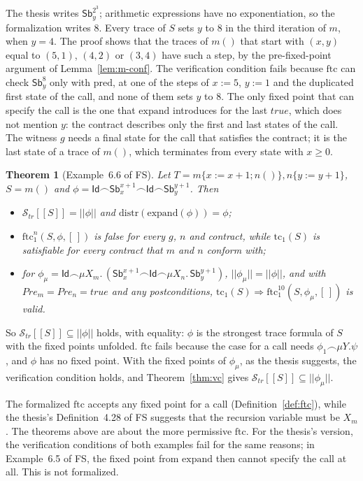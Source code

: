 \documentclass[11pt]{article}
\newcommand{\sem}[1]{[\![ #1 ]\!]}
\newcommand{\fsem}[1]{|\!|#1|\!|}
\newcommand{\Str}{{\mathcal{S}_{\mathit{tr}}}}
\newcommand{\chop}{\smallfrown}
\newcommand{\Id}{\mathsf{Id}}
\newcommand{\Sb}[2]{\mathsf{Sb}^{#1}_{#2}}
\newcommand{\call}[1]{#1()}
\newcommand{\Pre}{\mathit{Pre}}
\newcommand{\tc}{\mathrm{tc}}
\newcommand{\ftc}{\mathrm{ftc}}
\newcommand{\pred}{\mathrm{pred}}
\newcommand{\distr}{\mathrm{distr}}
\newcommand{\Th}[1]{#1 of FS}
\theoremstyle{plain}
\newtheorem{theorem}{Theorem}[section]
\theoremstyle{definition}
\theoremstyle{remark}
\begin{document}
The thesis writes $\Sb{2^3}{y}$; arithmetic expressions have no
exponentiation, so the formalization writes $8$. Every trace of $S$ sets
$y$ to $8$ in the third iteration of $m$, when $y = 4$. The proof shows
that the traces of $\call{m}$ that start with $(x, y)$ equal to $(5, 1)$,
$(4, 2)$ or $(3, 4)$ have such a step, by the pre-fixed-point argument of
Lemma~\ref{lem:m-conf}. The verification condition fails because $\ftc$
can check $\Sb{8}{y}$ only with $\pred$, at one of the steps of $x := 5$,
$y := 1$ and the duplicated first state of the call, and none of them
sets $y$ to $8$. The only fixed point that can specify the call is the
one that $\mathrm{expand}$ introduces for the last $\mathit{true}$, which
does not mention $y$: the contract describes only the first and last
states of the call. The witness $g$ needs a final state for the call that
satisfies the contract; it is the last state of a trace of $\call{m}$,
which terminates from every state with $x \ge 0$.

\begin{theorem}[\Th{Example~6.6}]\label{thm:ex66}
  Let $T = m\{x := x + 1; \call{n}\}, n\{y := y + 1\}$, $S = \call{m}$ and
  $\phi = \Id\chop\Sb{x+1}{x}\chop\Id\chop\Sb{y+1}{y}$. Then
  \begin{itemize}
  \item $\Str\sem{S} = \fsem{\phi}$ and $\distr(\mathrm{expand}(\phi)) =
    \phi$;
  \item $\ftc^n_1(S, \phi, [\,])$ is false for every $g$, $n$ and
    contract, while $\tc_1(S)$ is satisfiable for every contract that $m$
    and $n$ conform with;
  \item for $\phi_\mu = \Id\chop\mu X_m.\,(\Sb{x+1}{x}\chop\Id\chop\mu
    X_n.\,\Sb{y+1}{y})$, $\fsem{\phi_\mu} = \fsem{\phi}$, and with
    $\Pre_m = \Pre_n = \mathit{true}$ and any postconditions, $\tc_1(S)
    \Rightarrow \ftc^{10}_1(S, \phi_\mu, [\,])$ is valid.
  \end{itemize}
\end{theorem}

So $\Str\sem{S} \subseteq \fsem{\phi}$ holds, with equality: $\phi$ is the
strongest trace formula of $S$ with the fixed points unfolded. $\ftc$
fails because the case for a call needs $\phi_1\chop\mu Y.\psi$, and
$\phi$ has no fixed point. With the fixed points of $\phi_\mu$, as the
thesis suggests, the verification condition holds, and
Theorem~\ref{thm:vc} gives $\Str\sem{S} \subseteq \fsem{\phi_\mu}$.

The formalized $\ftc$ accepts any fixed point for a call
(Definition~\ref{def:ftc}), while the thesis's \Th{Definition~4.28}
suggests that the recursion variable must be $X_m$. The theorems above are
about the more permissive $\ftc$. For the thesis's version, the
verification conditions of both examples fail for the same reasons; in
\Th{Example~6.5}, the fixed point from $\mathrm{expand}$ then cannot
specify the call at all. This is not formalized.
\end{document}
